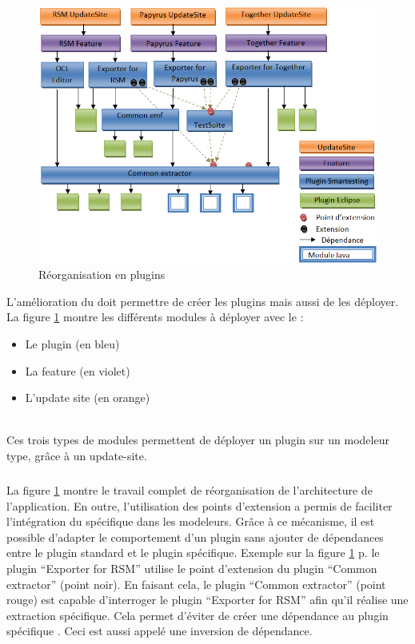 \begin{figure}[!h]
\begin{center}
  \includegraphics[width=\textwidth]{images/reorganisation2.png}
  \caption{Réorganisation en plugins}
  \label{reorganisation}
\end{center}
\end{figure}

L'amélioration du \build doit permettre de créer les plugins mais aussi de les déployer. La figure \ref{reorganisation} montre les différents modules à déployer avec le \build :
\begin{itemize}
  \item Le plugin (en bleu)
  \item La feature (en violet)
  \item L'update site (en orange)
\end{itemize}
\ \\
Ces trois types de modules permettent de déployer un plugin sur un modeleur type, grâce à un update-site.

\subparagraph*{}
La figure \ref{reorganisation} montre le travail complet de réorganisation de l'architecture de l'application. 
En outre, l'utilisation des points d'extension a permis de faciliter l'intégration du spécifique dans les modeleurs.
Grâce à ce mécanisme, il est possible d'adapter le comportement d'un plugin sans ajouter de dépendances entre le plugin standard et le plugin spécifique. 
Exemple sur la figure \ref{reorganisation} p.\pageref{reorganisation} le plugin ``Exporter for RSM'' utilise le point d'extension du plugin ``Common extractor'' (point noir).
En faisant cela, le plugin ``Common extractor'' (point rouge) est capable d'interroger le plugin ``Exporter for RSM'' afin qu'il réalise une extraction spécifique.
Cela permet d'éviter de créer une dépendance au plugin spécifique \rsm. Ceci est aussi appelé une inversion de dépendance.


